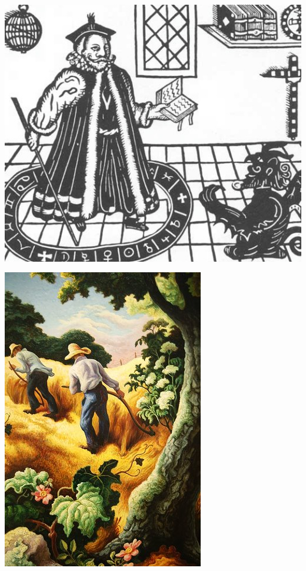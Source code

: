 \documentclass[20pt]{beamer}
\begin{document}
\begin{frame}
    \vspace*{-4mm}
	\hspace*{-5mm}
	\href{http://www.3ammagazine.com/3am/wp-content/uploads/2012/07/faust-33.jpeg}{\includegraphics[height=1.05\paperheight]{faust-33.jpeg}}
\end{frame}


\begin{frame}
  \vspace*{-14mm}
  \begin{center}
	\href{http://bjws.blogspot.hu/2012/10/1930s-americas-great-depression-thomas.html}{\includegraphics[height=1.5\paperheight]{jh.jpg}}
  \end{center}
\end{frame}
\end{document}

